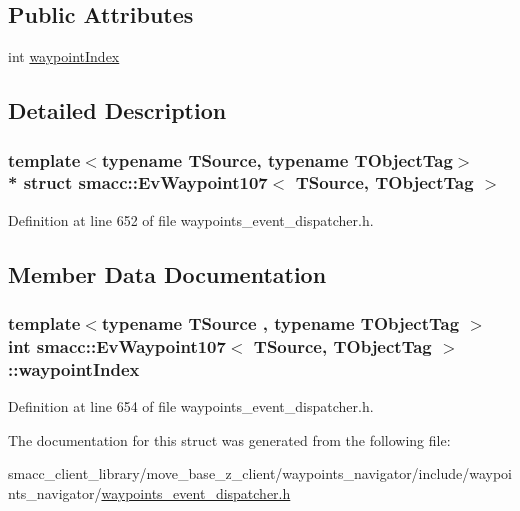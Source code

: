 \subsection*{Public Attributes}
\begin{DoxyCompactItemize}
\item 
int \hyperlink{structsmacc_1_1EvWaypoint107_a5278209ee15e03aad78110f7ab0c581d}{waypoint\+Index}
\end{DoxyCompactItemize}


\subsection{Detailed Description}
\subsubsection*{template$<$typename T\+Source, typename T\+Object\+Tag$>$\\*
struct smacc\+::\+Ev\+Waypoint107$<$ T\+Source, T\+Object\+Tag $>$}



Definition at line 652 of file waypoints\+\_\+event\+\_\+dispatcher.\+h.



\subsection{Member Data Documentation}
\subsubsection[{\texorpdfstring{waypoint\+Index}{waypointIndex}}]{\setlength{\rightskip}{0pt plus 5cm}template$<$typename T\+Source , typename T\+Object\+Tag $>$ int {\bf smacc\+::\+Ev\+Waypoint107}$<$ T\+Source, T\+Object\+Tag $>$\+::waypoint\+Index}\hypertarget{structsmacc_1_1EvWaypoint107_a5278209ee15e03aad78110f7ab0c581d}{}\label{structsmacc_1_1EvWaypoint107_a5278209ee15e03aad78110f7ab0c581d}


Definition at line 654 of file waypoints\+\_\+event\+\_\+dispatcher.\+h.



The documentation for this struct was generated from the following file\+:\begin{DoxyCompactItemize}
\item 
smacc\+\_\+client\+\_\+library/move\+\_\+base\+\_\+z\+\_\+client/waypoints\+\_\+navigator/include/waypoints\+\_\+navigator/\hyperlink{waypoints__event__dispatcher_8h}{waypoints\+\_\+event\+\_\+dispatcher.\+h}\end{DoxyCompactItemize}
